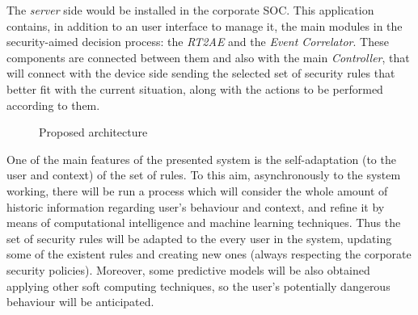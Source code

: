 \documentclass{sig-alternate}
\begin{document}
The \textit{server} side would be installed in the corporate SOC. This application contains, in addition to an user interface to manage it, the main modules in the security-aimed decision process: the \textit{RT2AE} and the \textit{Event Correlator}. These components are connected between them and also with the main \textit{Controller}, that will connect with the device side sending the selected set of security rules that better fit with the current situation, along with the actions to be performed according to them.

\begin{figure}
\centering
{}
\caption{Proposed architecture\label{fig:architecture}}
\end{figure}

One of the main features of the presented system is the self-adaptation (to the user and context) of the set of rules. To this aim, asynchronously to the system working, there will be run a process which will consider the whole amount of historic information regarding user's behaviour and context, and refine it by means of computational intelligence and machine learning techniques. Thus the set of security rules will be adapted to the every user in the system, updating some of the existent rules and creating new ones (always respecting the corporate security policies).
Moreover, some predictive models will be also obtained applying other soft computing techniques, so the user's potentially dangerous behaviour will be anticipated.


\end{document}
